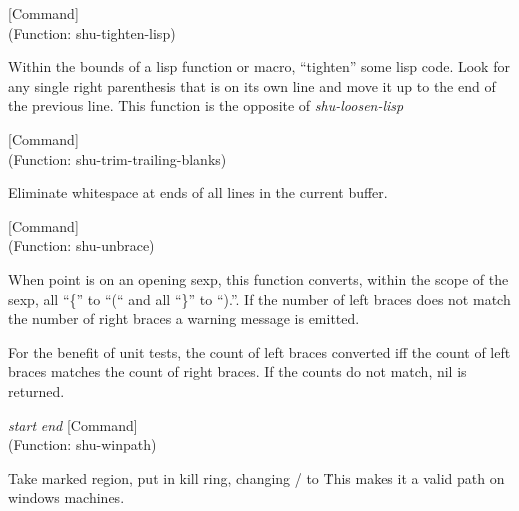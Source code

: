\vspace{1em}
\noindent
{}
\usebox{\funcname}
 \hfill [Command]\\%
 (Function: shu-tighten-lisp)

\begin{doc-string}
Within the bounds of a lisp function or macro, ``tighten'' some lisp code.
Look for any single right parenthesis that is on its own line and move it up to
the end of the previous line.  This function is the opposite of \emph{shu-loosen-lisp}
\end{doc-string}

\vspace{1em}
\noindent
{}
\usebox{\funcname}
 \hfill [Command]\\%
 (Function: shu-trim-trailing-blanks)

\begin{doc-string}
Eliminate whitespace at ends of all lines in the current buffer.
\end{doc-string}

\vspace{1em}
\noindent
{}
\usebox{\funcname}
 \hfill [Command]\\%
 (Function: shu-unbrace)

\begin{doc-string}
When point is on an opening sexp, this function converts, within the scope of
the sexp, all ``\{'' to ``(`` and all ``\}'' to ``).''.
If the number of left braces does not match the number of right braces a warning
message is emitted.

For the benefit of unit tests, the count of left braces converted iff the count
of left braces matches the count of right braces.  If the counts do not match,
nil is returned.
\end{doc-string}

\vspace{1em}
\noindent
{}
\usebox{\funcname}\emph{start} \emph{end}
 \hfill [Command]\\%
 (Function: shu-winpath)

\begin{doc-string}
Take marked region, put in kill ring, changing / to \.
This makes it a valid path on windows machines.
\end{doc-string}

